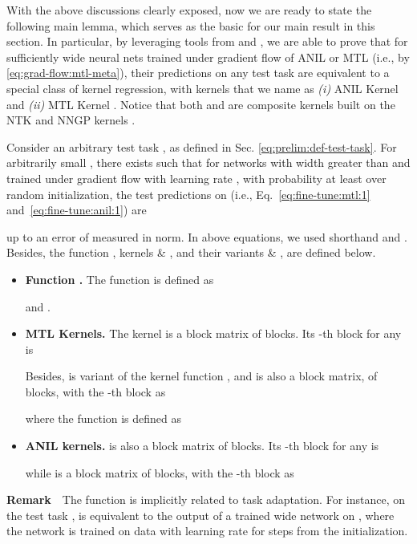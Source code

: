 \documentclass{article}
\begin{document}
With the above discussions clearly exposed, now we are ready to state the following main lemma, which serves as the basic for our main result in this section. In particular, by leveraging tools from \citet{lee2019wide} and \citet{meta-ntk}, we are able to prove that for sufficiently wide neural nets trained under gradient flow of ANIL or MTL (i.e., by \eqref{eq:grad-flow:mtl-meta}), their predictions on any test task are equivalent to a special class of kernel regression, with kernels that we name as \textit{(i)} ANIL Kernel  and \textit{(ii)} MTL Kernel . Notice that both  and  are composite kernels built on the NTK  and NNGP kernels . 

\begin{lemma} \label{lemma:test-predict}
Consider an arbitrary test task , as defined in Sec. \ref{eq:prelim:def-test-task}. For arbitrarily small , there exists  such that for networks with width greater than  and trained under gradient flow with learning rate , with probability at least  over random initialization, the test predictions on  (i.e., Eq.~\eqref{eq:fine-tune:mtl:1} and~\eqref{eq:fine-tune:anil:1}) are 

up to an error of  measured in  norm. In above equations, we used shorthand  and . Besides, the function , kernels  \& , and their variants  \& , are defined below. 
    
\begin{itemize}[leftmargin=*,align=left]
    \item \textbf{Function .} The function  is defined as
    
    and .
    \item \textbf{MTL Kernels.} The kernel  is a block matrix of  blocks. Its -th block for any  is
        
        Besides,  is variant of the kernel function , and  is also a block matrix, of  blocks, with the -th block as
        
        where the function  is defined as
        
    \item \textbf{ANIL kernels.}  is also a block matrix of  blocks. Its -th block for any  is
    
    while  is a block matrix of  blocks, with the -th block as 
    
    \end{itemize}
\end{lemma}
\textbf{Remark}~~The function  is implicitly related to task adaptation. For instance, on the test task ,  is equivalent to the output of a trained wide network on , where the network is trained on data  with learning rate  for  steps from the initialization. 
\end{document}
